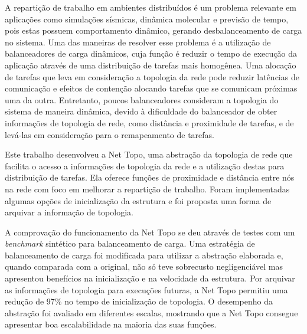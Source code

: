 \documentclass[
	12pt,				%
	openright,			%
	twoside,			%
	a4paper,			%
	english,			%
	brazil,				%
	]{abntex2}
\begin{document}

\begin{resumo}

A repartição de trabalho em ambientes distribuídos é um problema relevante em aplicações como simulações sísmicas, dinâmica molecular e previsão de tempo, pois estas possuem comportamento dinâmico, gerando desbalanceamento de carga no sistema. 
Uma das maneiras de resolver esse problema é a utilização de balanceadores de carga dinâmicos, cuja função é reduzir o tempo de execução da aplicação através de uma distribuição de tarefas mais homogênea. 
Uma alocação de tarefas que leva em consideração a topologia da rede pode reduzir latências de comunicação e efeitos de contenção alocando tarefas que se comunicam próximas uma da outra.
Entretanto, poucos balanceadores consideram a topologia do sistema de maneira dinâmica, devido à dificuldade do balanceador de obter informações de topologia de rede, como distância e proximidade de tarefas, e de levá-las em consideração para o remapeamento de tarefas.

Este trabalho desenvolveu a Net Topo, uma abstração da topologia de rede que facilita o acesso a informações de topologia da rede e a utilização destas para distribuição de tarefas.
Ela oferece funções de proximidade e distância entre nós na rede com foco em melhorar a repartição de trabalho.
Foram implementadas algumas opções de inicialização da estrutura e foi proposta uma forma de arquivar a informação de topologia.

A comprovação do funcionamento da Net Topo se deu através de testes com um \textit{benchmark} sintético para balanceamento de carga.
Uma estratégia de balanceamento de carga foi modificada para utilizar a abstração elaborada e, quando comparada com a original, não só teve sobrecusto negligenciável mas apresentou benefícios na inicialização e na velocidade da estrutura.
Por arquivar as informações de topologia para execuções futuras, a Net Topo permitiu uma redução de 97\% no tempo de inicialização de topologia.
O desempenho da abstração foi avaliado em diferentes escalas, mostrando que a Net Topo consegue apresentar boa escalabilidade na maioria das suas funções.






\end{resumo}
\end{document}
